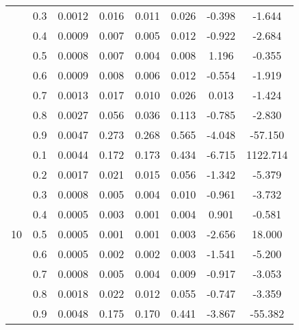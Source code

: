 \documentclass[11pt,a4paper]{report}
\begin{document}
\begin{longtable}{ | c | c || c | c | c | c | c | c | }
 & 0.3 & 0.0012 & 0.016 & 0.011 & 0.026 & -0.398 & -1.644 \\
 & 0.4 & 0.0009 & 0.007 & 0.005 & 0.012 & -0.922 & -2.684 \\
 & 0.5 & 0.0008 & 0.007 & 0.004 & 0.008 & 1.196 & -0.355 \\
 & 0.6 & 0.0009 & 0.008 & 0.006 & 0.012 & -0.554 & -1.919 \\
 & 0.7 & 0.0013 & 0.017 & 0.010 & 0.026 & 0.013 & -1.424 \\
 & 0.8 & 0.0027 & 0.056 & 0.036 & 0.113 & -0.785 & -2.830 \\
 & 0.9 & 0.0047 & 0.273 & 0.268 & 0.565 & -4.048 & -57.150 \\
 \hline
\multirow{9}{*}{10} & 0.1 & 0.0044 & 0.172 & 0.173 & 0.434 & -6.715 & 1122.714 \\
 & 0.2 & 0.0017 & 0.021 & 0.015 & 0.056 & -1.342 & -5.379 \\
 & 0.3 & 0.0008 & 0.005 & 0.004 & 0.010 & -0.961 & -3.732 \\
 & 0.4 & 0.0005 & 0.003 & 0.001 & 0.004 & 0.901 & -0.581 \\
 & 0.5 & 0.0005 & 0.001 & 0.001 & 0.003 & -2.656 & 18.000 \\
 & 0.6 & 0.0005 & 0.002 & 0.002 & 0.003 & -1.541 & -5.200 \\
 & 0.7 & 0.0008 & 0.005 & 0.004 & 0.009 & -0.917 & -3.053 \\
 & 0.8 & 0.0018 & 0.022 & 0.012 & 0.055 & -0.747 & -3.359 \\
 & 0.9 & 0.0048 & 0.175 & 0.170 & 0.441 & -3.867 & -55.382 \\
 \hline
\hline
\end{longtable}
\end{document}
